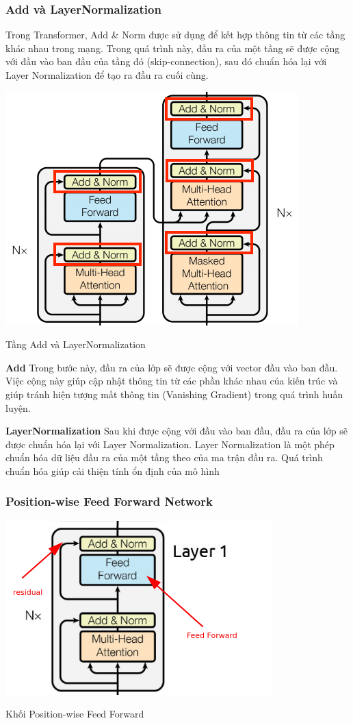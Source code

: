 \documentclass[a4paper, 12pt, openany]{book}
\begin{document}
\subsubsection{Add và LayerNormalization}
Trong Transformer, Add \& Norm được sử dụng để kết hợp thông tin
từ các tầng khác nhau trong mạng. Trong quá trình này, đầu ra của một tầng sẽ được
cộng với đầu vào ban đầu của tầng đó (skip-connection), sau đó chuẩn hóa lại với Layer
Normalization để tạo ra đầu ra cuối cùng.

\begin{minipage}{\linewidth}
    \captionsetup{type=figure}
    \centering
    \includegraphics[width=.8\linewidth]{./assets/images/Add+Norm.png}
    \caption{Tầng Add và LayerNormalization}
\end{minipage}
\textbf{Add}
Trong bước này, đầu ra của lớp sẽ được cộng với vector
đầu vào ban đầu. Việc cộng này giúp cập nhật thông tin từ các phần khác nhau của kiến
trúc và giúp tránh hiện tượng mất thông tin (Vanishing Gradient) trong quá trình huấn
luyện.

\textbf{LayerNormalization}
Sau khi được cộng với đầu vào ban đầu, đầu ra của lớp sẽ được chuẩn hóa lại với
Layer Normalization. Layer Normalization là một phép chuẩn hóa dữ liệu đầu ra của
một tầng theo của ma trận đầu ra. Quá
trình chuẩn hóa giúp cải thiện tính ổn định của mô hình

\subsubsection{Position-wise Feed Forward Network}
\begin{minipage}{\linewidth}
    \captionsetup{type=figure}
    \centering
    \includegraphics[width=.6\linewidth]{./assets/images/feed-forward-sublayer-in-transformer.png}
    \caption{Khối Position-wise Feed Forward}
\end{minipage}
\end{document}

